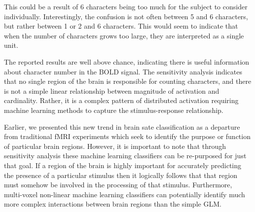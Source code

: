 \documentclass[preprint,authoryear,12pt]{elsarticle}
\begin{document}
This could be a result of 6 characters being too much for the subject to consider individually.
Interestingly, the confusion is not often between 5 and 6 characters, but rather between 1 or 2 and 6 characters.
This would seem to indicate that when the number of characters grows too large, they are interpreted as a single unit.

The reported results are well above chance, indicating there is useful information about character number in the BOLD signal.
The sensitivity analysis indicates that no single region of the brain is responsible for counting characters, and there is not a simple linear relationship between magnitude of activation and cardinality.
Rather, it is a complex pattern of distributed activation requiring machine learning methods to capture the stimulus-response relationship.

Earlier, we presented this new trend in brain sate classification as a departure from traditional fMRI experiments which seek to identify the purpose or function of particular brain regions.
However, it is important to note that through sensitivity analysis these machine learning classifiers can be re-purposed for just that goal.
If a region of the brain is highly important for accurately predicting the presence of a particular stimulus then it logically follows that that region must somehow be involved in the processing of that stimulus.
Furthermore, multi-voxel non-linear machine learning classifiers can potentially identify much more complex interactions between brain regions than the simple GLM.


\end{document}
